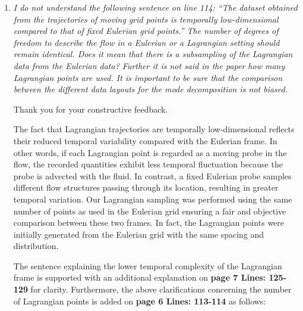 \documentclass[a4paper]{article}
\begin{document}
\begin{enumerate}
\textcolor{blue}{P9. L197-204: For brevity, the framework and the observation values are abbreviated as $\textit{E}$, $\textit{L}$, and $\textit{ME}$ for Eulerian, Lagrangian, and moving-Eulerian frameworks, followed by $\textit{G}$, $\textit{V}$ or $P$ which refer to gas volume fraction, upward component of the velocity field, and the coordinates of the data points, respectively. Here, only the upward (vertical) velocity component is used, as the rise velocity is determined exclusively by this component. Considering three frame of references, two decomposition methods and three observation values, there can be 18 combinations that can be defined. For instance, the decomposition of the upward velocity field in the Eulerian frame using the POD method is denoted as $\textit{EV-POD}$. Further details regarding the input and output data matrices are given in Appendix B.}


\item
\textit{I do not understand the following sentence on line 114: ``The dataset obtained from the trajectories of moving grid points is temporally low-dimensional compared to that of fixed Eulerian grid points.'' The number of degrees of freedom to describe the flow in a Eulerian or a Lagrangian setting should remain identical. Does it mean that there is a subsampling of the Lagrangian data from the Eulerian data? Further it is not said in the paper how many Lagrangian points are used. It is important to be sure that the comparison between the different data layouts for the mode decomposition is not biased.}
\vspace{.2cm}


Thank you for your constructive feedback. 


The fact that Lagrangian trajectories are temporally low-dimensional reflects their reduced temporal variability compared with the Eulerian frame. In other words, if each Lagrangian point is regarded as a moving probe in the flow, the recorded quantities exhibit less temporal fluctuation because the probe is advected with the fluid. In contrast, a fixed Eulerian probe samples different flow structures passing through its location, resulting in greater temporal variation. Our Lagrangian sampling was performed using the same number of points as used in the Eulerian grid ensuring a fair and objective comparison between these two frames. In fact, the Lagrangian points were initially generated from the Eulerian grid with the same spacing and distribution. 

The sentence explaining the lower temporal complexity of the Lagrangian frame is supported with an additional explanation on \textbf{page 7 Lines: 125-129} for clarity. Furthermore, the above clarifications concerning the number of Lagrangian points is added on \textbf{page 6 Lines: 113-114} as follows:


\end{enumerate}
\end{document}
